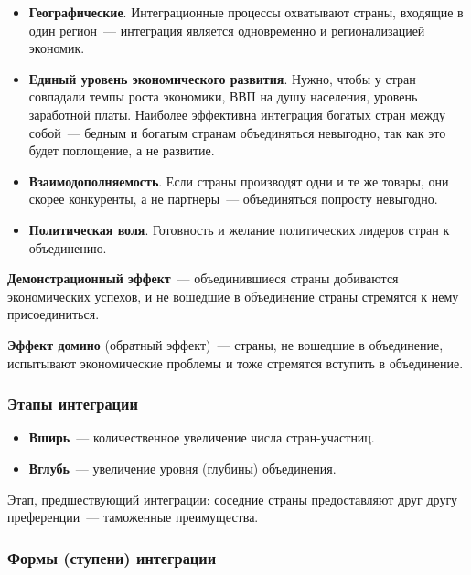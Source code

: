 \documentclass[12pt]{article}
\begin{document}
    \begin{itemize}
    	\item \textbf{Географические}. Интеграционные процессы охватывают страны, входящие в один регион~--- интеграция является одновременно и регионализацией экономик.
    	\item \textbf{Единый уровень экономического развития}. Нужно, чтобы у стран совпадали темпы роста экономики, ВВП на душу населения, уровень заработной платы. Наиболее эффективна интеграция богатых стран между собой~--- бедным и богатым странам объединяться невыгодно, так как это будет поглощение, а не развитие.
    	\item \textbf{Взаимодополняемость}. Если страны производят одни и те же товары, они скорее конкуренты, а не партнеры~--- объединяться попросту невыгодно.
    	\item \textbf{Политическая воля}. Готовность и желание политических лидеров стран к объединению.
    \end{itemize}
    
    \begin{note}
    	\textbf{Демонстрационный эффект}~--- объединившиеся страны добиваются экономических успехов, и не вошедшие в объединение страны стремятся к нему присоединиться.
    
    	\textbf{Эффект домино} (обратный эффект)~--- страны, не вошедшие в объединение, испытывают экономические проблемы и тоже стремятся вступить в объединение.
    \end{note}
    
    \subsubsection{Этапы интеграции}
    
    \begin{itemize}
    	\item \textbf{Вширь}~--- количественное увеличение числа стран-участниц.
    	\item \textbf{Вглубь}~--- увеличение уровня (глубины) объединения.
    \end{itemize}
    
    \begin{note}
    	Этап, предшествующий интеграции: соседние страны предоставляют друг другу преференции~--- таможенные преимущества.
    \end{note}
    
    \subsubsection{Формы (ступени) интеграции}
    
\end{document}
